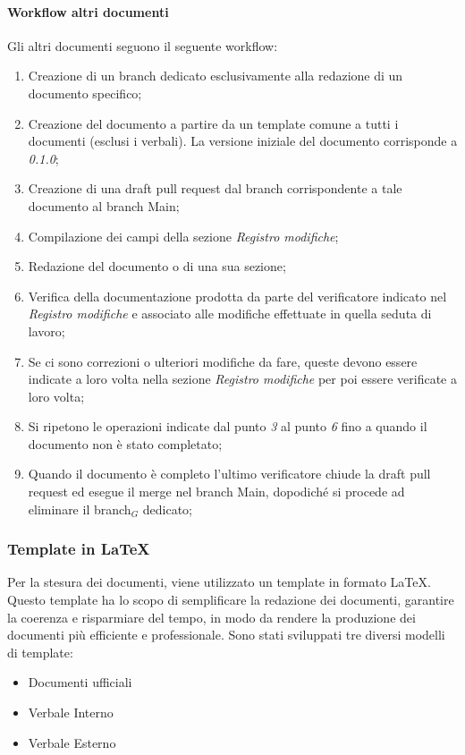 \documentclass[10pt]{article}
\begin{document}
\begin{justify}
        \paragraph{Workflow altri documenti}
        Gli altri documenti seguono il seguente workflow:
        \begin{enumerate}
            \item Creazione di un branch dedicato esclusivamente alla redazione di un documento specifico;
            \item Creazione del documento a partire da un template comune a tutti i documenti (esclusi i verbali). La versione iniziale del documento corrisponde a \textit{0.1.0};
            \item Creazione di una draft pull request dal branch corrispondente a tale documento al branch Main;
            \item Compilazione dei campi della sezione \textit{Registro modifiche};
            \item Redazione del documento o di una sua sezione;
            \item Verifica della documentazione prodotta da parte del verificatore indicato nel \textit{Registro modifiche} e associato alle modifiche effettuate in quella seduta di lavoro;
            \item Se ci sono correzioni o ulteriori modifiche da fare, queste devono essere indicate a loro volta nella sezione \textit{Registro modifiche} per poi essere verificate a loro volta;
            \item Si ripetono le operazioni indicate dal punto \textit{3} al punto \textit{6} fino a quando il documento non è stato completato;
            \item Quando il documento è completo l'ultimo verificatore
            chiude la draft pull request ed esegue il merge nel branch Main, dopodiché si procede ad eliminare il branch$_G$ dedicato;
        \end{enumerate}

    \subsubsection{Template in \LaTeX}
    Per la stesura dei documenti, viene utilizzato un template in formato \LaTeX. Questo template ha lo scopo di semplificare la redazione dei documenti, garantire la coerenza e risparmiare del tempo, in modo da rendere la produzione dei documenti più efficiente e professionale. Sono stati sviluppati tre diversi modelli di template:
    \begin{itemize}
        \item Documenti ufficiali
        \item Verbale Interno
        \item Verbale Esterno
    \end{itemize}


\end{justify}
\end{document}
